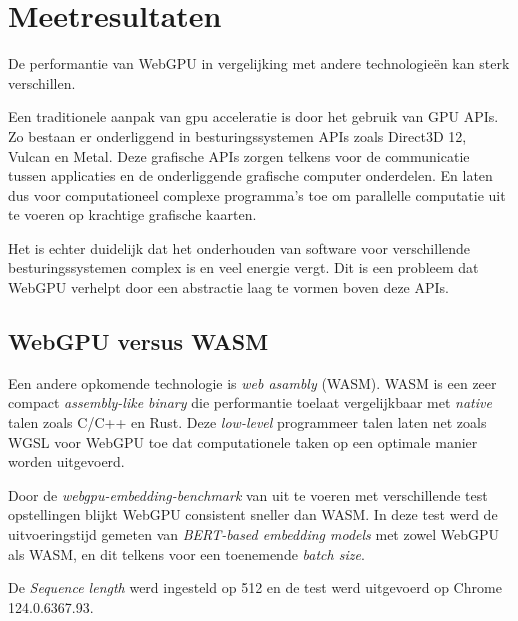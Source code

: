\chapter{Meetresultaten}%
\label{ch:benchmarks}

De performantie van WebGPU in vergelijking met andere technologieën kan sterk verschillen. 

Een traditionele aanpak van gpu acceleratie is door het gebruik van GPU APIs. Zo bestaan er onderliggend in besturingssystemen APIs zoals Direct3D 12, Vulcan en Metal. Deze grafische APIs zorgen telkens voor de communicatie tussen applicaties en de onderliggende grafische computer onderdelen. En laten dus voor computationeel complexe programma's toe om parallelle computatie uit te voeren op krachtige grafische kaarten.

\bigbreak{}

Het is echter duidelijk dat het onderhouden van software voor verschillende besturingssystemen complex is en veel energie vergt. Dit is een probleem dat WebGPU verhelpt door een abstractie laag te vormen boven deze APIs. \autocite{Wallez2023} 

\break{}

\section*{WebGPU versus WASM}

Een andere opkomende technologie is  \textit{web asambly} (WASM). WASM is een zeer compact \textit{assembly-like binary} die performantie toelaat vergelijkbaar met \textit{native} talen zoals C/C++ en Rust. \autocite{Steiner2023} Deze \textit{low-level} programmeer talen laten net zoals WGSL voor WebGPU toe dat computationele taken op een optimale manier worden uitgevoerd.

\bigbreak{}



Door de \textit{webgpu-embedding-benchmark} van \textcite{Lochner2024} uit te voeren met verschillende test opstellingen blijkt WebGPU consistent sneller dan WASM. In deze test werd de uitvoeringstijd gemeten van \textit{BERT-based embedding models} met zowel WebGPU als WASM, en dit telkens voor een toenemende \textit{batch size}.

\bigbreak{}

De \textit{Sequence length} werd ingesteld op 512 en de test werd uitgevoerd op Chrome 124.0.6367.93.